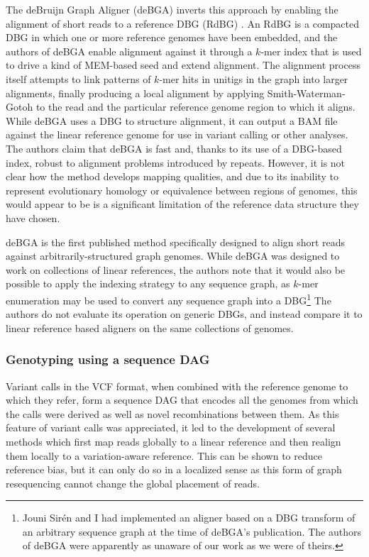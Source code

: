 The deBruijn Graph Aligner (deBGA) inverts this approach by enabling the alignment of short reads to a reference DBG (RdBG) \cite{liu2016debga}.
An RdBG is a compacted DBG in which one or more reference genomes have been embedded, and the authors of deBGA enable alignment against it through a $k$-mer index that is used to drive a kind of MEM-based seed and extend alignment.
The alignment process itself attempts to link patterns of $k$-mer hits in unitigs in the graph into larger alignments, finally producing a local alignment by applying Smith-Waterman-Gotoh to the read and the particular reference genome region to which it aligns.
While deBGA uses a DBG to structure alignment, it can output a BAM file against the linear reference genome for use in variant calling or other analyses.
The authors claim that deBGA is fast and, thanks to its use of a DBG-based index, robust to alignment problems introduced by repeats.
However, it is not clear how the method develops mapping qualities, and due to its inability to represent evolutionary homology or equivalence between regions of genomes, this would appear to be is a significant limitation of the reference data structure they have chosen.

deBGA is the first published method specifically designed to align short reads against arbitrarily-structured graph genomes.
While deBGA was designed to work on collections of linear references, the authors note that it would also be possible to apply the indexing strategy to any sequence graph, as $k$-mer enumeration may be used to convert any sequence graph into a DBG\footnote{Jouni Sir\'{e}n and I had implemented an aligner based on a DBG transform of an arbitrary sequence graph at the time of deBGA's publication. The authors of deBGA were apparently as unaware of our work as we were of theirs.}
The authors do not evaluate its operation on generic DBGs, and instead compare it to linear reference based aligners on the same collections of genomes.

\subsubsection{Genotyping using a sequence DAG}
\label{sec:seq_dag_vcf}
Variant calls in the VCF format, when combined with the reference genome to which they refer, form a sequence DAG that encodes all the genomes from which the calls were derived as well as novel recombinations between them.
As this feature of variant calls was appreciated, it led to the development of several methods which first map reads globally to a linear reference and then realign them locally to a variation-aware reference.
This can be shown to reduce reference bias, but it can only do so in a localized sense as this form of graph resequencing cannot change the global placement of reads.

